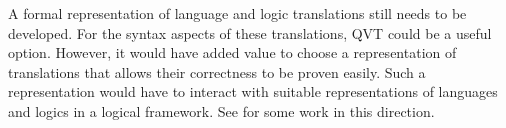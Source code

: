 \documentclass[10pt, a4paper]{isov2}
\begin{document}
\label{sec:repr-trans}

A formal representation of language and logic translations still needs
to be developed. For the syntax aspects of these translations, QVT
could be a useful option. However, it would have added value to choose
a representation of translations that allows  their correctness
to be proven easily. Such a representation would have to interact
with suitable representations of languages and logics in a 
logical framework. See \cite{CodescuEtAl2011d} for some work
in this direction.


\cleardoublepage
{}\label{a:ext-graph}
\end{document}
